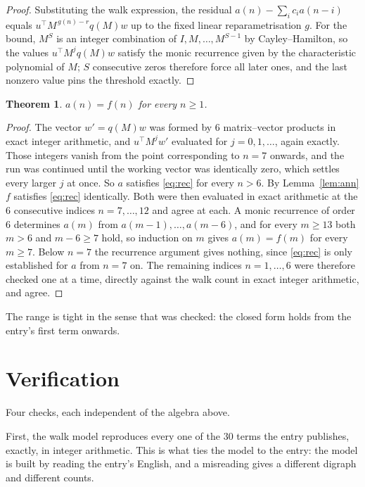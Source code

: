 \documentclass[11pt,a4paper]{article}
\theoremstyle{plain}
\newtheorem{theorem}{Theorem}
\theoremstyle{definition}
\begin{document}
\begin{proof}
Substituting the walk expression, the residual $a(n)-\sum_ic_ia(n-i)$ equals
$u^{\!\top}M^{\,g(n)-r}q(M)w$ up to the fixed linear reparametrisation $g$. For the bound,
$M^{S}$ is an integer combination of $I,M,\dots,M^{S-1}$ by Cayley--Hamilton, so the values
$u^{\!\top}M^{j}q(M)w$ satisfy the monic recurrence given by the characteristic polynomial of
$M$; $S$ consecutive zeros therefore force all later ones, and the last nonzero value pins the
threshold exactly.
\end{proof}

\begin{theorem}
$a(n)=f(n)$ for every $n\ge1$.
\end{theorem}

\begin{proof}
The vector $w'=q(M)w$ was formed by $6$ matrix--vector products in exact integer
arithmetic, and $u^{\!\top}M^{j}w'$ evaluated for $j=0,1,\dots$, again exactly. Those integers
vanish from the point corresponding to $n=7$ onwards, and the run was continued until the
working vector was identically zero, which settles every larger $j$ at once. So $a$ satisfies
\eqref{eq:rec} for every $n>6$. By Lemma~\ref{lem:ann} $f$ satisfies \eqref{eq:rec}
identically. Both were then evaluated in exact arithmetic at the $6$ consecutive indices
$n=7,\dots,12$ and agree at each. A monic recurrence of order $6$
determines $a(m)$ from $a(m-1),\dots,a(m-6)$, and for every $m\ge13$ both
$m>6$ and $m-6\ge7$ hold, so induction on $m$ gives $a(m)=f(m)$ for every
$m\ge7$.
Below $n=7$ the recurrence argument gives nothing, since \eqref{eq:rec} is only
established for $a$ from $n=7$ on. The remaining indices $n=1,\dots,6$ were
therefore checked one at a time, directly against the walk count in exact integer arithmetic,
and agree.
\end{proof}

The range is tight in the sense that was checked: the closed form holds from the entry's first term onwards.

\section{Verification}

Four checks, each independent of the algebra above.

First, the walk model reproduces every one of the $30$ terms the entry publishes,
exactly, in integer arithmetic. This is what ties the model to the entry: the model is built
by reading the entry's English, and a misreading gives a different digraph and different
counts.
\end{document}
